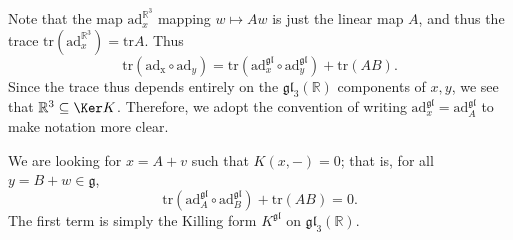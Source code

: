 \documentclass[11pt, letterpaper]{article}
\theoremstyle{plain}
\begin{document}
Note that the map $\mathrm{ad} _x^{\mathbb{R} ^3} $ mapping $w\mapsto Aw$ is just the linear map $A$, and thus the trace $\mathrm{tr} \left(\mathrm{ad} _x^{\mathbb{R} ^3}\right) =\mathrm{tr}A$. Thus
\[
	\mathrm{tr} (\mathrm{ad_x} \circ \mathrm{ad} _y) = \mathrm{tr} \left( \mathrm{ad} _x^{\mathfrak{gl} } \circ \mathrm{ad} _y^{\mathfrak{gl} }  \right) +\mathrm{tr} \left( AB \right)  
.\]
Since the trace thus depends entirely on the $\mathfrak{gl} _3(\mathbb{R} )$ components of $x,y$, we see that $\mathbb{R} ^3 \subseteq \Ker K$. Therefore, we adopt the convention of writing $\mathrm{ad} _x^{\mathfrak{gl} } =\mathrm{ad} _A^{\mathfrak{gl} } $ to make notation more clear.

We are looking for $x=A+v$ such that $K(x,-)=0$; that is, for all $y=B+w\in \mathfrak{g} $,
\[
	\mathrm{tr} \left( \mathrm{ad} _A^{\mathfrak{gl} } \circ \mathrm{ad} _B^{\mathfrak{gl} }  \right) +\mathrm{tr} (AB)=0
.\]
The first term is simply the Killing form $K^{\mathfrak{gl} } $ on $\mathfrak{gl} _3(\mathbb{R} )$. 
\end{document}
